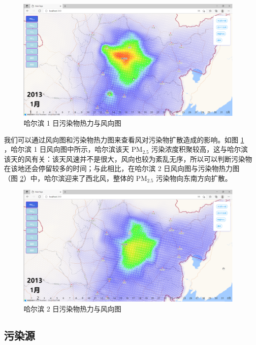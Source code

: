 \documentclass[UTF8]{ctexrep}
\begin{document}
	\begin{figure}[h!]
        \centering
        \includegraphics[width=15cm,keepaspectratio]{images/wind_map1.png}
        \caption{哈尔滨 1 日污染物热力与风向图}
        \label{fig:wind_map1}
    \end{figure}
    
    我们可以通过风向图和污染物热力图来查看风对污染物扩散造成的影响。如图 \ref{fig:wind_map1} ，哈尔滨 1 日风向图中所示，哈尔滨该天 $\mathrm{PM}_{2.5}$ 污染浓度积聚较高，这与哈尔滨该天的风有关：该天风速并不是很大，风向也较为紊乱无序，所以可以判断污染物在该地还会停留较多的时间；与此相比，在哈尔滨 2 日风向图与污染物热力图（图 \ref{fig:wind_map2}）中，哈尔滨迎来了西北风，整体的 $\mathrm{PM}_{2.5}$ 污染物向东南方向扩散。
    
    \begin{figure}[h!]
        \centering
        \includegraphics[width=15cm,keepaspectratio]{images/wind_map2.png}
        \caption{哈尔滨 2 日污染物热力与风向图}
        \label{fig:wind_map2}
    \end{figure}


    \subsection{污染源}
\end{document}
